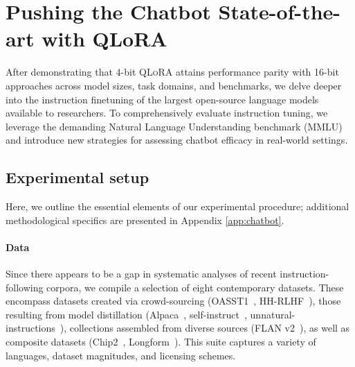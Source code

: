 \section{Pushing the Chatbot State-of-the-art with QLoRA}
\label{sec:pushing}
After demonstrating that 4-bit \textsc{QLoRA} attains performance parity with 16-bit approaches across model sizes, task domains, and benchmarks, we delve deeper into the instruction finetuning of the largest open-source language models available to researchers. To comprehensively evaluate instruction tuning, we leverage the demanding Natural Language Understanding benchmark (MMLU) and introduce new strategies for assessing chatbot efficacy in real-world settings.

\subsection{Experimental setup} Here, we outline the essential elements of our experimental procedure; additional methodological specifics are presented in Appendix \ref{app:chatbot}.

\paragraph{Data} Since there appears to be a gap in systematic analyses of recent instruction-following corpora, we compile a selection of eight contemporary datasets. These encompass datasets created via crowd-sourcing (OASST1~\citep{kopf2023openassistant}, HH-RLHF~\citep{bai2022training}), those resulting from model distillation (Alpaca~\citep{alpaca}, self-instruct~\citep{wang2022self}, unnatural-instructions~\citep{honovich2022unnatural}), collections assembled from diverse sources (FLAN v2~\citep{chung2022scaling}), as well as composite datasets (Chip2~\citep{laion2023}, Longform~\citep{koksal2023longform}). This suite captures a variety of languages, dataset magnitudes, and licensing schemes.

